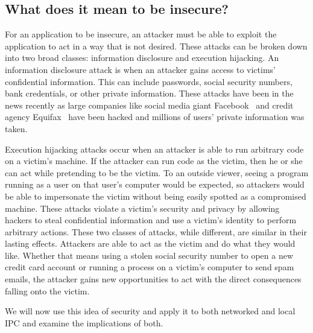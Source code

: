 \subsection{What does it mean to be insecure?}
\label{sec:whatIsInsecure}
For an application to be insecure, an attacker must be able to exploit the application to act in a way that is not desired.  These attacks can be broken down into two broad classes: information disclosure and execution hijacking.  An information disclosure attack is when an attacker gains access to victims' confidential information.  This can include passwords, social security numbers, bank credentials, or other private information.  These attacks have been in the news recently as large companies like social media giant Facebook~\cite{o'sullivan_2018} and credit agency Equifax~\cite{timberg_dwoskin_fung_2017} have been hacked and millions of users' private information was taken.  

Execution hijacking attacks occur when an attacker is able to run arbitrary code on a victim's machine.  If the attacker can run code as the victim, then he or she can act while pretending to be the victim.  To an outside viewer, seeing a program running as a user on that user's computer would be expected, so attackers would be able to impersonate the victim without being easily spotted as a compromised machine.  These attacks violate a victim's security and privacy by allowing hackers to steal confidential information and use a victim's identity to perform arbitrary actions.  These two classes of attacks, while different, are similar in their lasting effects.  Attackers are able to act as the victim and do what they would like.  Whether that means using a stolen social security number to open a new credit card account or running a process on a victim's computer to send spam emails, the attacker gains new opportunities to act with the direct consequences falling onto the victim.

We will now use this idea of security and apply it to both networked and local IPC and examine the implications of both.

